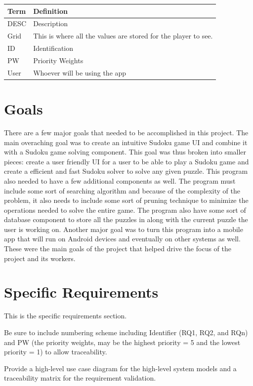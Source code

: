 \documentclass{article}
\begin{document}
\begin{tabular}{ | m{8em} | m{24em}|  } 
\hline
\textbf{Term}& \textbf{Definition}  \\ 
\hline
DESC & Description  \\ 
\hline
Grid & This is where all the values are stored for the player to see.  \\ 
\hline
ID & Identification  \\ 
\hline
PW & Priority Weights  \\ 
\hline
User & Whoever will be using the app  \\ 
\hline
\end{tabular}

 

\section{Goals}
There are a few major goals that needed to be accomplished in this project. The main overaching goal was to create an intuitive Sudoku game UI and combine it with a Sudoku game solving component. This goal was thus broken into smaller pieces: create a user friendly UI for a user to be able to play a Sudoku game and create a efficient and fast Sudoku solver to solve any given puzzle. This program also needed to have a few additional components as well. The program must include some sort of searching algorithm and because of the complexity of the problem, it also needs to include some sort of pruning technique to minimize the operations needed to solve the entire game. The program also have some sort of database component to store all the puzzles in along with the current puzzle the user is working on. Another major goal was to turn this program into a mobile app that will run on Android devices and eventually on other systems as well. These were the main goals of the project that helped drive the focus of the project and its workers.

 
\section{Specific Requirements}
This is the specific requirements section.

Be sure to include numbering scheme including Identifier (RQ1, RQ2, and RQn) and PW (the priority weights, may be the highest priority = 5 and the lowest priority = 1) to allow traceability.

Provide a high-level use case diagram for the high-level system models and a traceability matrix for the requirement validation.
 
\end{document}
